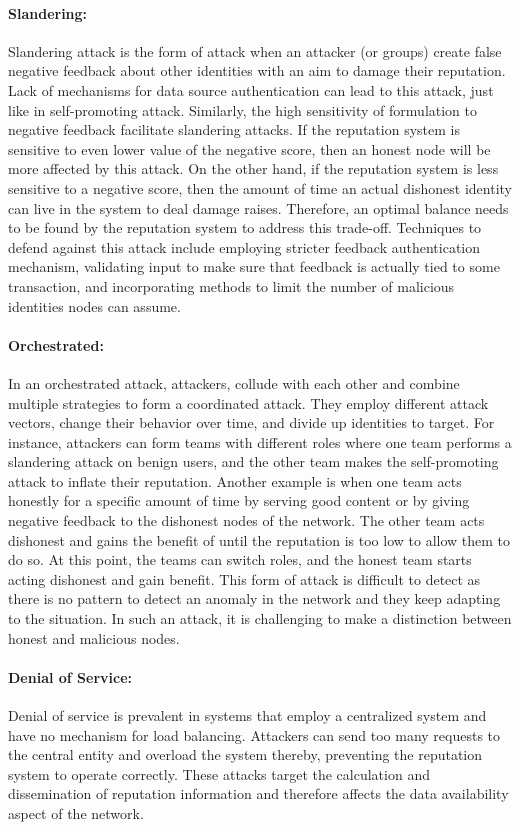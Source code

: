\paragraph{Slandering:} Slandering attack is the form of attack when an
attacker (or groups) create false negative feedback about other identities with
an aim to damage their reputation. Lack of mechanisms for data source
authentication can lead to this attack, just like in self-promoting attack.
Similarly, the high sensitivity of formulation to negative feedback facilitate
slandering attacks. If the reputation system is sensitive to even lower value
of the negative score, then an honest node will be more affected by this
attack. On the other hand, if the reputation system is less sensitive to a
negative score, then the amount of time an actual dishonest identity can live
in the system to deal damage raises. Therefore, an optimal balance needs to be
found by the reputation system to address this trade-off. Techniques to defend
against this attack include employing stricter feedback authentication
mechanism, validating input to make sure that feedback is actually tied to some
transaction, and incorporating methods to limit the number of malicious
identities nodes can assume.   
\paragraph{Orchestrated:} In an orchestrated attack, attackers, collude with
each other and combine multiple strategies to form a coordinated attack. They
employ different attack vectors, change their behavior over time, and divide up
identities to target. For instance, attackers can form teams with different
roles where one team performs a slandering attack on benign users, and the
other team makes the self-promoting attack to inflate their reputation. Another
example is when one team acts honestly for a specific amount of time by serving
good content or by giving negative feedback to the dishonest nodes of the
network. The other team acts dishonest and gains the benefit of until the
reputation is too low to allow them to do so. At this point, the teams can
switch roles, and the honest team starts acting dishonest and gain benefit.
This form of attack is difficult to detect as there is no pattern to detect an
anomaly in the network and they keep adapting to the situation. In such an
attack, it is challenging to make a distinction between honest and malicious
nodes. 
\paragraph{Denial of Service:} Denial of service is prevalent in systems that
employ a centralized system and have no mechanism for load balancing. Attackers
can send too many requests to the central entity and overload the system
thereby, preventing the reputation system to operate correctly. These attacks
target the calculation and dissemination of reputation information and
therefore affects the data availability aspect of the network.  
